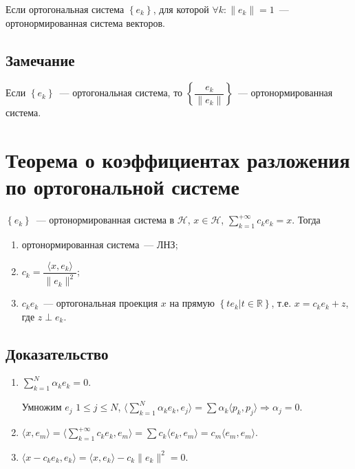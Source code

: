 \documentclass{article}
\begin{document}
        Если ортогональная система $\left\{ e_k \right\}$, для которой $\forall k : \| e_k \| = 1$~--- ортонормированная система векторов.
        
        \subsection{Замечание} 
        
            Если $\left\{ e_k \right\}$~--- ортогональная система, то $\left\{ \dfrac{e_k}{\| e_k \|} \right\}$~--- ортонормированная система.
        
    \newpage
        
    \section{Теорема о коэффициентах разложения по ортогональной системе}
    
        $\left\{ e_k \right\}$~--- ортонормированная система в $\mathcal{H}$, $x \in \mathcal{H}$, $\sum\limits_{k = 1}^{+\infty} c_k e_k = x$. Тогда
        
        \begin{enumerate}
        
            \item ортонормированная система~--- ЛНЗ;
            
            \item $c_k = \dfrac{\langle x, e_k \rangle}{\| e_k \|^2}$;
            
            \item $c_k e_k$~--- ортогональная проекция $x$ на прямую $\left\{ t e_k | t \in \mathbb{R} \right\}$, т.е. $x = c_k e_k + z$, где $z \perp e_k$.
            
        \end{enumerate}
        
        \subsection{Доказательство}
        
            \begin{enumerate}
            
                \item $\sum\limits_{k = 1}^N \alpha_k e_k = 0$.
                
                    Умножим $e_j$ $1 \leqslant j \leqslant N$, $\langle \sum\limits_{k = 1}^N \alpha_k e_k, e_j \rangle = \sum \alpha_k \langle p_k, p_j \rangle \Rightarrow \alpha_j = 0$.
                    
                \item $\langle x, e_m \rangle = \langle \sum\limits_{k = 1}^{+\infty} c_k e_k, e_m \rangle = \sum c_k \langle e_k, e_m \rangle = c_m \langle e_m, e_m \rangle$.
                
                \item $\langle x - c_k e_k, e_k \rangle = \langle x, e_k \rangle - c_k \| e_k \|^2 = 0$.
                
            \end{enumerate}
                
\end{document}
